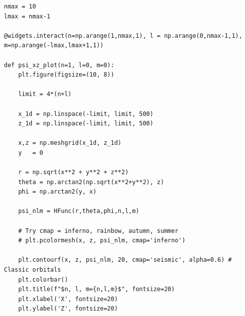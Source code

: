 \begin{lstlisting}[style=MyPython]
nmax = 10
lmax = nmax-1

@widgets.interact(n=np.arange(1,nmax,1), l = np.arange(0,nmax-1,1), m=np.arange(-lmax,lmax+1,1))

def psi_xz_plot(n=1, l=0, m=0):
    plt.figure(figsize=(10, 8))
    
    limit = 4*(n+l) 
    
    x_1d = np.linspace(-limit, limit, 500)
    z_1d = np.linspace(-limit, limit, 500)
    
    x,z = np.meshgrid(x_1d, z_1d)
    y   = 0
    
    r = np.sqrt(x**2 + y**2 + z**2)
    theta = np.arctan2(np.sqrt(x**2+y**2), z)
    phi = np.arctan2(y, x)

    psi_nlm = HFunc(r,theta,phi,n,l,m)
    
    # Try cmap = inferno, rainbow, autumn, summer
    # plt.pcolormesh(x, z, psi_nlm, cmap='inferno')
    
    plt.contourf(x, z, psi_nlm, 20, cmap='seismic', alpha=0.6) # Classic orbitals
    plt.colorbar()
    plt.title(f"$n, l, m={n,l,m}$", fontsize=20)
    plt.xlabel('X', fontsize=20)
    plt.ylabel('Z', fontsize=20)
\end{lstlisting}


